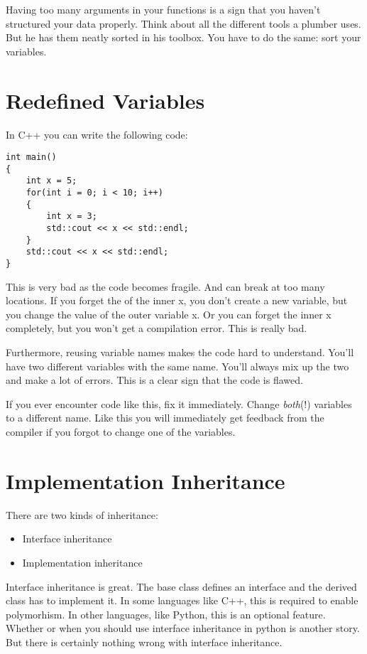 Having too many arguments in your functions is a sign that you haven't structured your data properly. Think about all the different tools a plumber uses. But he has them neatly sorted in his toolbox. You have to do the same: sort your variables.

\section{Redefined Variables}

In C++ you can write the following code:

\begin{programcode}{}
\begin{verbatim}
int main()
{
    int x = 5;
    for(int i = 0; i < 10; i++)
    {
        int x = 3;
        std::cout << x << std::endl;
    }
    std::cout << x << std::endl;
}
\end{verbatim}
\end{programcode}

This is very bad as the code becomes fragile. And can break at too many locations. If you forget the  of the inner x, you don't create a new variable, but you change the value of the outer variable x. Or you can forget the inner x completely, but you won't get a compilation error. This is really bad.

Furthermore, reusing variable names makes the code hard to understand. You'll have two different variables with the same name. You'll always mix up the two and make a lot of errors. This is a clear sign that the code is flawed.

If you ever encounter code like this, fix it immediately. Change \textit{both}(!) variables to a different name. Like this you will immediately get feedback from the compiler if you forgot to change one of the variables.

\section{Implementation Inheritance}

There are two kinds of inheritance:
\begin{itemize}
    \item Interface inheritance
    \item Implementation inheritance
\end{itemize}

Interface inheritance is great. The base class defines an interface and the derived class has to implement it. In some languages like C++, this is required to enable polymorhism. In other languages, like Python, this is an optional feature. Whether or when you should use interface inheritance in python is another story. But there is certainly nothing wrong with interface inheritance.

